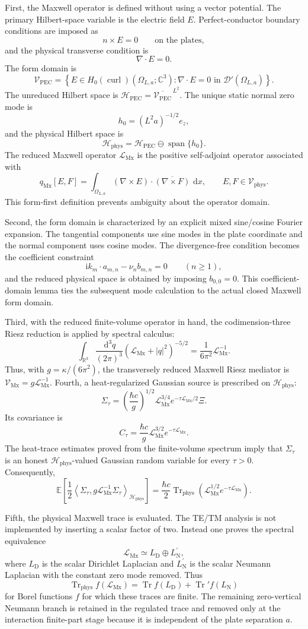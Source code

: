 \documentclass[11pt]{article}
\providecommand{\R}{\mathbb{R}}
\providecommand{\C}{\mathbb{C}}
\providecommand{\ii}{\mathrm{i}}
\providecommand{\dd}{\,\mathrm{d}}
\providecommand{\hbarc}{\hbar c}
\providecommand{\E}{\mathbb{E}}
\providecommand{\Tr}{\operatorname{Tr}}
\providecommand{\Trphys}{\operatorname{Tr}_{\mathrm{phys}}}
\providecommand{\abs}[1]{\left\lvert #1\right\rvert}
\providecommand{\inner}[2]{\left\langle #1,#2\right\rangle}
\providecommand{\set}[1]{\left\{#1\right\}}
\providecommand{\paren}[1]{\left(#1\right)}
\providecommand{\OmegaLa}{\Omega_{L,a}}
\providecommand{\Hphys}{\mathcal H_{\mathrm{phys}}}
\providecommand{\HPEC}{\mathcal H_{\mathrm{PEC}}}
\providecommand{\VPEC}{\mathcal V_{\mathrm{PEC}}}
\providecommand{\Vphys}{\mathcal V_{\mathrm{phys}}}
\providecommand{\Hzcurl}{H_0(\operatorname{curl})}
\providecommand{\hzero}{h_0}
\providecommand{\qMx}{q_{\mathrm{Mx}}}
\providecommand{\LMx}{\mathcal L_{\mathrm{Mx}}}
\providecommand{\VMx}{\mathcal V_{\mathrm{Mx}}}
\providecommand{\LD}{L_{\mathrm D}}
\providecommand{\LN}{L_{\mathrm N}}
\providecommand{\LNp}{L_{\mathrm N}^{\prime}}
\providecommand{\XiNoise}{\Xi}
\providecommand{\Sigmatau}{\Sigma_{\tau}}
\providecommand{\Ctau}{C_{\tau}}
\numberwithin{equation}{section}
\begin{document}
First, the Maxwell operator is defined without using a vector potential.  The
primary Hilbert-space variable is the electric field \(E\).  Perfect-conductor
boundary conditions are imposed as
\[
    n\times E=0
    \qquad\text{on the plates},
\]
and the physical transverse condition is
\[
    \nabla\cdot E=0 .
\]
The form domain is
\[
    \VPEC
    =
    \set{E\in\Hzcurl(\OmegaLa;\C^3):
          \nabla\cdot E=0\text{ in }\mathcal D'(\OmegaLa)} .
\]
The unreduced Hilbert space is \(\HPEC=\overline{\VPEC}^{\,L^2}\).  The
unique static normal zero mode is
\[
    \hzero=(L^2a)^{-1/2}e_z,
\]
and the physical Hilbert space is
\[
    \Hphys=\HPEC\ominus\operatorname{span}\{\hzero\} .
\]
The reduced Maxwell operator \(\LMx\) is the positive self-adjoint operator
associated with
\[
    \qMx[E,F]
    =
    \int_{\OmegaLa}
    (\nabla\times E)\cdot\overline{(\nabla\times F)}\,\dd x,
    \qquad E,F\in\Vphys .
\]
This form-first definition prevents ambiguity about the operator domain.

Second, the form domain is characterized by an explicit mixed sine/cosine
Fourier expansion.  The tangential components use sine modes in the plate
coordinate and the normal component uses cosine modes.  The divergence-free
condition becomes the coefficient constraint
\[
    \ii k_m\cdot a_{m,n}-\nu_n b_{m,n}=0
    \qquad(n\geq1),
\]
and the reduced physical space is obtained by imposing \(b_{0,0}=0\).  This
coefficient-domain lemma ties the subsequent mode calculation to the actual
closed Maxwell form domain.

Third, with the reduced finite-volume operator in hand, the codimension-three
Riesz reduction is applied by spectral calculus:
\[
    \int_{\R^3}\frac{\dd^3q}{(2\pi)^3}
    (\LMx+\abs q^2)^{-5/2}
    =
    \frac{1}{6\pi^2}\LMx^{-1} .
\]
Thus, with \(g=\kappa/(6\pi^2)\), the transversely reduced Maxwell Riesz
mediator is \( \VMx=g\LMx^{-1}\).
Fourth, a heat-regularized Gaussian source is prescribed on \(\Hphys\):
\[
    \Sigmatau
    =
    \paren{\frac{\hbarc}{g}}^{1/2}
    \LMx^{3/4}e^{-\tau\LMx/2}\XiNoise .
\]
Its covariance is
\[
    \Ctau
    =
    \frac{\hbarc}{g}\LMx^{3/2}e^{-\tau\LMx} .
\]
The heat-trace estimates proved from the finite-volume spectrum imply that
\(\Sigmatau\) is an honest \(\Hphys\)-valued Gaussian random variable for every
\(\tau>0\).  Consequently,
\[
    \E\left[
        \frac12\inner{\Sigmatau}{g\LMx^{-1}\Sigmatau}_{\Hphys}
    \right]
    =
    \frac{\hbarc}{2}
    \Trphys\paren{\LMx^{1/2}e^{-\tau\LMx}} .
\]

Fifth, the physical Maxwell trace is evaluated.  The TE/TM analysis is not
implemented by inserting a scalar factor of two.  Instead one proves the
spectral equivalence
\[
    \LMx\simeq \LD\oplus\LNp,
\]
where \(\LD\) is the scalar Dirichlet Laplacian and \(\LNp\) is the scalar
Neumann Laplacian with the constant zero mode removed.  Thus
\[
    \Trphys f(\LMx)
    =
    \Tr f(\LD)+\Tr' f(\LN)
\]
for Borel functions \(f\) for which these traces are finite.  The remaining
zero-vertical Neumann branch is
retained in the regulated trace and removed only at the interaction
finite-part stage because it is independent of the plate separation \(a\).
\end{document}
